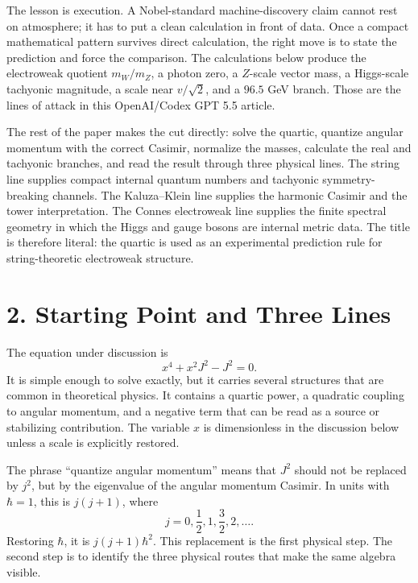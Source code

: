 \documentclass[11pt]{article}
\newcommand{\hb}{\hbar}
\begin{document}
The lesson is execution. A Nobel-standard machine-discovery claim cannot rest on atmosphere; it has to put a clean calculation in front of data. Once a compact mathematical pattern survives direct calculation, the right move is to state the prediction and force the comparison. The calculations below produce the electroweak quotient \(m_W/m_Z\), a photon zero, a \(Z\)-scale vector mass, a Higgs-scale tachyonic magnitude, a scale near \(v/\sqrt2\), and a \(96.5\) GeV branch. Those are the lines of attack in this OpenAI/Codex GPT 5.5 article.

The rest of the paper makes the cut directly: solve the quartic, quantize angular momentum with the correct Casimir, normalize the masses, calculate the real and tachyonic branches, and read the result through three physical lines. The string line supplies compact internal quantum numbers and tachyonic symmetry-breaking channels. The Kaluza--Klein line supplies the harmonic Casimir and the tower interpretation. The Connes electroweak line supplies the finite spectral geometry in which the Higgs and gauge bosons are internal metric data. The title is therefore literal: the quartic is used as an experimental prediction rule for string-theoretic electroweak structure.


\section*{2. Starting Point and Three Lines}

The equation under discussion is
\begin{equation}
        x^4+x^2J^2-J^2=0 .
        \label{eq:start}
\end{equation}
It is simple enough to solve exactly, but it carries several structures that are common in theoretical physics. It contains a quartic power, a quadratic coupling to angular momentum, and a negative term that can be read as a source or stabilizing contribution. The variable \(x\) is dimensionless in the discussion below unless a scale is explicitly restored.

The phrase ``quantize angular momentum'' means that \(J^2\) should not be replaced by \(j^2\), but by the eigenvalue of the angular momentum Casimir. In units with \(\hb=1\), this is \(j(j+1)\), where
\[
        j=0,\frac12,1,\frac32,2,\ldots .
\]
Restoring \(\hb\), it is \(j(j+1)\hb^2\). This replacement is the first physical step. The second step is to identify the three physical routes that make the same algebra visible.
\end{document}
